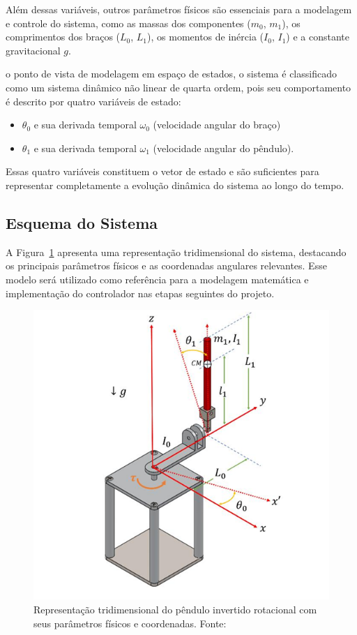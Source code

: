 \documentclass[9pt,a4paper,twocolumn,twoside]{tau-class/tau}
\begin{document}
    Além dessas variáveis, outros parâmetros físicos são essenciais para a modelagem e controle do sistema, como as massas dos componentes ($m_0$, $m_1$), os comprimentos dos braços ($L_0$, $L_1$), os momentos de inércia ($I_0$, $I_1$) e a constante gravitacional $g$.

    o ponto de vista de modelagem em espaço de estados, o sistema é classificado como um sistema dinâmico não linear de quarta ordem, pois seu comportamento é descrito por quatro variáveis de estado:
    \begin{itemize}
    
    \item $\theta_0$ e sua derivada temporal $\omega_0$ (velocidade angular do braço)

    \item $\theta_1$ e sua derivada temporal $\omega_1$ (velocidade angular do pêndulo).
    
    \end{itemize}
    Essas quatro variáveis constituem o vetor de estado e são suficientes para representar completamente a evolução dinâmica do sistema ao longo do tempo.

    \subsection{Esquema do Sistema}
    
    A Figura~\ref{fig:esquema} apresenta uma representação tridimensional do sistema, destacando os principais parâmetros físicos e as coordenadas angulares relevantes. Esse modelo será utilizado como referência para a modelagem matemática e implementação do controlador nas etapas seguintes do projeto.
    
    \begin{figure}[H]
        \centering
        \includegraphics[width=0.85\columnwidth]{figures/pendulo com angulos.png}
        \caption{Representação tridimensional do pêndulo invertido rotacional com seus parâmetros físicos e coordenadas. Fonte: \cite{Duart2017}}
        \label{fig:esquema}
    \end{figure}
   
\end{document}

